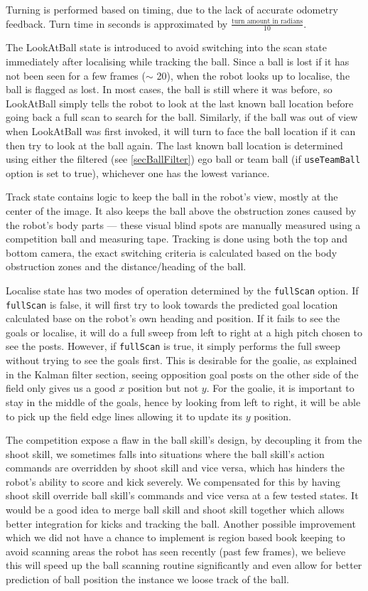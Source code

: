 \documentclass[pdftex,11pt,a4paper]{report}
\begin{document}
Turning is performed based on timing, due to the lack of accurate odometry feedback. Turn time in seconds is approximated by $\frac{\text{turn amount in radians}}{10}$.

The LookAtBall state is introduced to avoid switching into the scan state immediately after localising while tracking the ball. Since a ball is lost if it has not been seen for a few frames ($\sim$ 20), when the robot looks up to localise, the ball is flagged as lost. In most cases, the ball is still where it was before, so LookAtBall simply tells the robot to look at the last known ball location before going back a full scan to search for the ball. Similarly, if the ball was out of view when LookAtBall was first invoked, it will turn to face the ball location if it can then try to look at the ball again. The last known ball location is determined using either the filtered (see \autoref{secBallFilter}) ego ball or team ball (if {\tt useTeamBall} option is set to true), whichever one has the lowest variance. 

Track state contains logic to keep the ball in the robot's view, mostly at the center of the image. It also keeps the ball above the obstruction zones caused by the robot's body parts --- these visual blind spots are manually measured using a competition ball and measuring tape. Tracking is done using both the top and bottom camera, the exact switching criteria is calculated based on the body obstruction zones and the distance/heading of the ball.

Localise state has two modes of operation determined by the {\tt fullScan} option. If {\tt fullScan} is false, it will first try to look towards the predicted goal location calculated base on the robot's own heading and position. If it fails to see the goals or localise, it will do a full sweep from left to right at a high pitch chosen to see the posts. However, if {\tt fullScan} is true, it simply performs the full sweep without trying to see the goals first. This is desirable for the goalie, as explained in the Kalman filter section, seeing opposition goal posts on the other side of the field only gives us a good $x$ position but not $y$. For the goalie, it is important to stay in the middle of the goals, hence by looking from left to right, it will be able to pick up the field edge lines allowing it to update its $y$ position.

The competition expose a flaw in the ball skill's design, by decoupling it from the shoot skill, we sometimes falls into situations where the ball skill's action commands are overridden by shoot skill and vice versa, which has hinders the robot's ability to score and kick severely. We compensated for this by having shoot skill override ball skill's commands and vice versa at a few tested states. It would be a good idea to merge ball skill and shoot skill together which allows better integration for kicks and tracking the ball. Another possible improvement which we did not have a chance to implement is region based book keeping to avoid scanning areas the robot has seen recently (past few frames), we believe this will speed up the ball scanning routine significantly and even allow for better prediction of ball position the instance we loose track of the ball.
\end{document}

